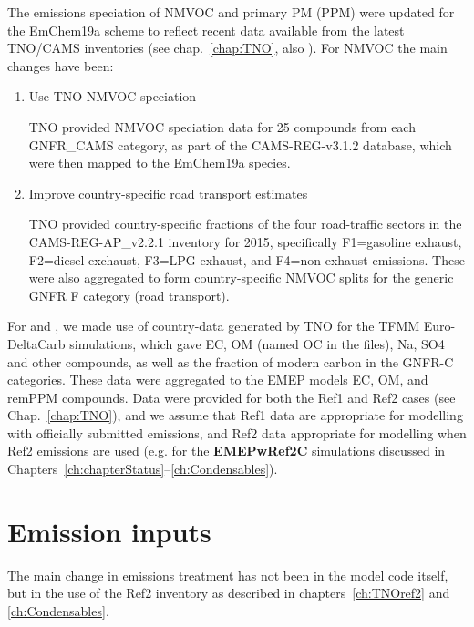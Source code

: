 The emissions speciation of NMVOC and primary PM (PPM) were updated
for the EmChem19a scheme to reflect recent data available from
the latest TNO/CAMS inventories (see chap.~\ref{chap:TNO}, also
\citealt{CAMSemis2019}).  For NMVOC the main changes have been:

\begin{enumerate}
  \item Use TNO NMVOC speciation

    TNO provided NMVOC speciation data for 25 compounds from each
    GNFR\_CAMS category, as part of the CAMS-REG-v3.1.2 database,
    which were then mapped to the EmChem19a species.

  \item Improve country-specific road transport estimates

    TNO provided country-specific fractions of the four road-traffic
    sectors in the CAMS-REG-AP\_v2.2.1 inventory for 2015, specifically
    F1=gasoline exhaust, F2=diesel exchaust, F3=LPG exhaust, and
    F4=non-exhaust emissions. These were also aggregated to form
    country-specific NMVOC splits for the generic GNFR F category
    (road transport).

\end{enumerate}


For \pmfine and \pmten, we made use of country-data generated by TNO for
the TFMM Euro-DeltaCarb simulations, which gave EC, OM (named
OC in the files), Na, SO4 and other compounds, as well as the fraction
of modern carbon in the GNFR-C categories. These data were aggregated
to the EMEP models EC, OM, and remPPM compounds. Data were provided for
both the Ref1 and Ref2 cases (see Chap.~\ref{chap:TNO}), and we assume
that Ref1 data are appropriate for modelling with officially submitted
emissions, and Ref2 data appropriate for modelling when Ref2 emissions
are used (e.g. for the \textbf{EMEPwRef2C} simulations discussed in
Chapters~\ref{ch:chapterStatus}--\ref{ch:Condensables}).


\section{Emission inputs}
\label{sec:EmisInp}

The main change in emissions treatment has not been in the model code itself,
but in the use of the Ref2 inventory as described in chapters~\ref{ch:TNOref2} and \ref{ch:Condensables}.




